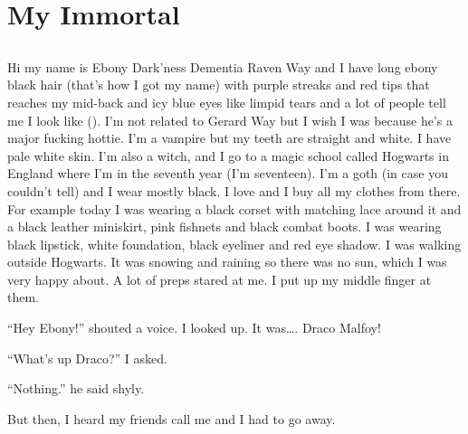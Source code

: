 \chapter{My Immortal}

\section{}


\XXX{\Xfill}

Hi my name is Ebony Dark'ness Dementia Raven Way and I have long ebony black hair (that's how I got my name) with purple streaks and red tips that reaches my mid-back and icy blue eyes like limpid tears and a lot of people tell me I look like  (). I'm not related to Gerard Way but I wish I was because he's a major fucking hottie. I'm a vampire but my teeth are straight and white. I have pale white skin. I'm also a witch, and I go to a magic school called Hogwarts in England where I'm in the seventh year (I'm seventeen). I'm a goth (in case you couldn't tell) and I wear mostly black. I love  and I buy all my clothes from there. For example today I was wearing a black corset with matching lace around it and a black leather miniskirt, pink fishnets and black combat boots. I was wearing black lipstick, white foundation, black eyeliner and red eye shadow. I was walking outside Hogwarts. It was snowing and raining so there was no sun, which I was very happy about. A lot of preps stared at me. I put up my middle finger at them.

\enquote{Hey Ebony!} shouted a voice. I looked up. It was…. Draco Malfoy!

\enquote{What's up Draco?} I asked.

\enquote{Nothing.} he said shyly.

But then, I heard my friends call me and I had to go away.

\XXX{\Xfill}

